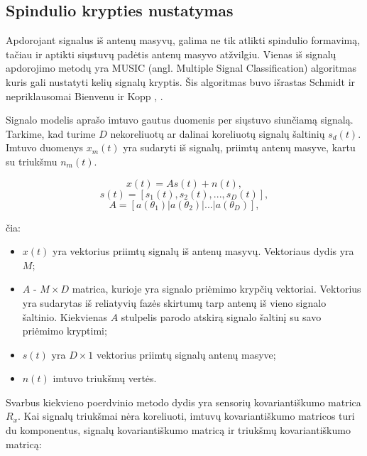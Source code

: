 \documentclass[main.tex]{subfiles}
\begin{document}
\subsection{Spindulio krypties nustatymas}\label{sec:music}

Apdorojant signalus iš antenų masyvų, galima ne tik atlikti spindulio
formavimą, tačiau ir aptikti siųstuvų padėtis antenų masyvo atžvilgiu.
Vienas iš signalų apdorojimo metodų yra MUSIC (angl. Multiple Signal Classification)
algoritmas kuris gali nustatyti kelių signalų kryptis.
Šis algoritmas buvo išrastas Schmidt \cite{1143830} ir nepriklausomai
Bienvenu ir Kopp \cite{1171029}, \cite{1164185}.

Signalo modelis aprašo imtuvo gautus duomenis per siųstuvo siunčiamą signalą. Tarkime, kad
turime $D$ nekoreliuotų ar dalinai koreliuotų signalų šaltinių $s_d(t)$. Imtuvo
duomenys $x_m(t)$ yra sudaryti iš signalų, priimtų antenų masyve, kartu su triukšmu
$n_m(t)$.

\begin{equation}
    x(t) = As(t) + n(t),
\end{equation}
\begin{equation}
    s(t) = [s_1(t), s_2(t),...,s_D(t)],
\end{equation}
\begin{equation}
    A = [a(\theta_1) | a(\theta_2) | ... | a(\theta_D)],
\end{equation}

\noindent čia:

\begin{itemize}
    \item $x(t)$ yra vektorius priimtų signalų iš antenų masyvų. Vektoriaus dydis yra $M$;
    \item $A$ - $M\times D$ matrica, kurioje yra signalo priėmimo krypčių vektoriai. Vektorius
    yra sudarytas iš reliatyvių fazės skirtumų tarp antenų iš vieno signalo šaltinio. Kiekvienas
    $A$ stulpelis parodo atskirą signalo šaltinį su savo priėmimo kryptimi;
    \item $s(t)$ yra $D\times 1$ vektorius priimtų signalų antenų masyve;
    \item $n(t)$ imtuvo triukšmų vertės.
\end{itemize}

Svarbus kiekvieno poerdvinio metodo dydis yra sensorių kovariantiškumo matrica $R_x$.
Kai signalų triukšmai nėra koreliuoti, imtuvų kovariantiškumo matricos turi du komponentus,
signalų kovariantiškumo matricą ir triukšmų kovariantiškumo matricą:
\end{document}
